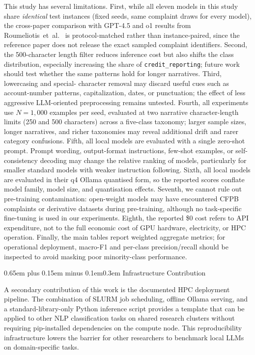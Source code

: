 \documentclass[10pt,a4paper,twocolumn]{article}
\makeatletter
\renewcommand\subsection{\@startsection{subsection}{2}{0pt}%
  {0.65em plus 0.15em minus 0.1em}{0.3em}%
  {\normalfont\normalsize\itshape}}
\makeatother
\begin{document}
This study has several limitations. First, while all eleven models
in this study share \emph{identical} test instances (fixed seeds,
same complaint draws for every model), the cross-paper comparison
with GPT-4.5 and o1 results from Roumeliotis~et~al.\
\cite{roumeliotis2025think} is protocol-matched rather than
instance-paired, since the reference paper does not release the
exact sampled complaint identifiers.
Second, the 500-character length filter reduces inference cost but
also shifts the class distribution, especially increasing the share of
\texttt{credit\_reporting}; future work should test whether the same
patterns hold for longer narratives. Third, lowercasing and special-
character removal may discard useful cues such as account-number
patterns, capitalization, dates, or punctuation; the effect of less
aggressive LLM-oriented preprocessing remains untested. Fourth, all
experiments use $N{=}1{,}000$ examples per seed, evaluated at two
narrative character-length limits (250 and 500 characters) across a
five-class taxonomy; larger sample sizes, longer narratives, and richer
taxonomies may reveal additional drift and rarer category confusions.
Fifth, all local models are evaluated with a single zero-shot prompt.
Prompt wording, output-format instructions, few-shot examples, or
self-consistency decoding may change the relative ranking of models,
particularly for smaller standard models with weaker instruction
following. Sixth, all local models are evaluated in their q4 Ollama
quantised form, so the reported scores conflate model family, model
size, and quantisation effects. Seventh, we cannot rule out pre-training
contamination: open-weight models may have encountered CFPB complaints
or derivative datasets during pre-training, although no task-specific
fine-tuning is used in our experiments. Eighth, the reported \$0 cost
refers to API expenditure, not to the full economic cost of GPU
hardware, electricity, or HPC operation. Finally, the main tables
report weighted aggregate metrics; for operational deployment,
macro-F1 and per-class precision/recall should be inspected to avoid
masking poor minority-class performance.

\subsection{Infrastructure Contribution}

A secondary contribution of this work is the documented HPC
deployment pipeline. The combination of SLURM job scheduling,
offline Ollama serving, and a standard-library-only Python inference
script provides a template that can be applied to other NLP
classification tasks on shared research clusters without requiring
pip-installed dependencies on the compute node. This reproducibility
infrastructure lowers the barrier for other researchers to benchmark
local LLMs on domain-specific tasks.
\end{document}
